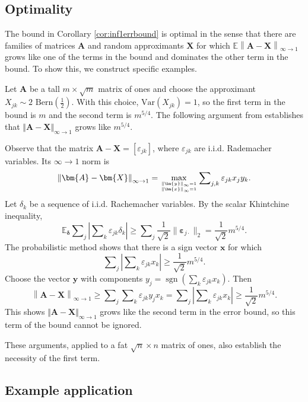 \documentclass[11pt,letterpaper,twoside,reqno]{amsart}
\newcommand{\mat}[1]{\ensuremath{\bm{#1}}}
\newcommand{\E}{\ensuremath{\mathbb{E}}}
\newcommand{\norm}[1]{\ensuremath{\left\|#1\right\|}}
\newcommand{\infnorm}[1]{\ensuremath{\left\|#1\right\|_\infty}}
\newcommand{\infonorm}[1]{\ensuremath{\left\|#1\right\|_{\infty\rightarrow 1}}}
\newcommand{\infone}{\ensuremath{\infty\!\rightarrow\!\!1}}
\newcommand{\var}[1]{\ensuremath{\mathrm{Var}(#1)}}
\DeclareMathOperator{\sgn}{sgn}
\begin{document}
\subsection{Optimality}

The bound in Corollary \ref{cor:inf1errbound} is optimal in the sense that there are families of matrices $\mat{A}$ and random approximants $\mat{X}$ for which $\E\infonorm{\mat{A}-\mat{X}}$ grows like one of the terms in the bound and dominates the other term in the bound. To show this, we construct specific examples.

Let $\mat{A}$ be a tall $m\times\sqrt{m}$ matrix of ones and choose the approximant $X_{jk} \sim 2\text{ Bern}\left(\tfrac{1}{2}\right).$
With this choice, $\var{X_{jk}}=1$, so the first term in the bound is $m$ and the second term is $m^{5/4}.$
The following argument from \cite[Sec. 4.2]{RV07} establishes that $\Vert\mat{A}-\mat{X}\Vert_{\infty\rightarrow1}$ grows like $m^{5/4}$.

Observe that the matrix $\mat{A}-\mat{X}=[\varepsilon_{jk}]$, where $\varepsilon_{jk}$ are i.i.d. Rademacher variables. Its $\infone$ norm is 
\[
\infonorm{\mat{A}-\mat{X}}=\max_{{{\infnorm{\mat{y}}=1\atop \infnorm{\mat{x}}=1}}}\sum\nolimits_{j,k}\varepsilon_{jk}x_{j}y_{k}.
\]
Let $\delta_{k}$ be a sequence of i.i.d. Rachemacher variables. By the scalar Khintchine inequality, 
\[
\E_{\boldsymbol{\delta}}\sum\nolimits_{j}\left|\sum\nolimits_{k}\varepsilon_{jk}\delta_{k}\right|\geq\sum\nolimits_{j}\frac{1}{\sqrt{2}}\|\boldsymbol{\varepsilon}_{j\cdot}\|_{2}=\frac{1}{\sqrt{2}}m^{5/4}.
\]
The probabilistic method shows that there is a sign vector $\mat{x}$ for which 
\[
\sum\nolimits_{j}\left|\sum\nolimits_{k}\varepsilon_{jk}x_{k}\right|\geq\frac{1}{\sqrt{2}}m^{5/4}.
\]
Choose the vector $\mat{y}$ with components $y_{j}=\sgn(\sum_{k}\varepsilon_{jk}x_{k}).$ Then 
\[
\norm{\mat{A}-\mat{X}}_{\infty\rightarrow1}\geq\sum\nolimits_{j}\sum\nolimits_{k}\varepsilon_{jk}y_{j}x_{k}=\sum\nolimits_{j}\left|\sum\nolimits_{k}\varepsilon_{jk}x_{k}\right|\geq\frac{1}{\sqrt{2}}m^{5/4}.
\]
This shows $\Vert\mat{A}-\mat{X}\Vert_{\infty\rightarrow1}$ grows like the second term in the error bound, so this term of the bound cannot be ignored.

These arguments, applied to a fat $\sqrt{n}\times n$ matrix of ones, also establish the necessity of the first term.


\subsection{Example application}
\end{document}
